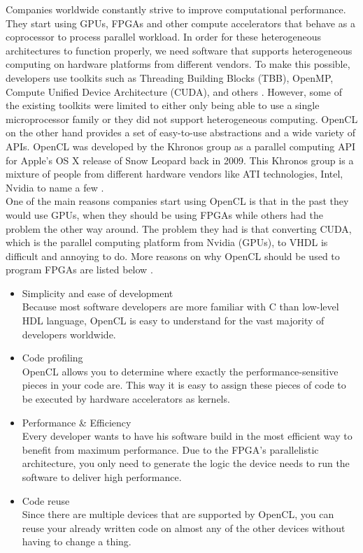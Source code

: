 \documentclass[a4paper, 11pt]{report}
\begin{document}
Companies worldwide constantly strive to improve computational performance. They start using GPUs, FPGAs and other compute accelerators that behave as a coprocessor to process parallel workload. In order for these heterogeneous architectures to function properly, we need software that supports heterogeneous computing on hardware platforms from different vendors. To make this possible, developers use toolkits such as Threading Building Blocks (TBB), OpenMP, Compute Unified Device Architecture (CUDA), and others \cite{stone2010opencl}. However, some of the existing toolkits were limited to either only being able to use a single microprocessor family or they did not support heterogeneous computing. OpenCL on the other hand provides a set of easy-to-use abstractions and a wide variety of APIs. OpenCL was developed by the Khronos group as a parallel computing API for Apple's OS X release of Snow Leopard back in 2009. This Khronos group is a mixture of people from different hardware vendors like ATI technologies, Intel, Nvidia to name a few \cite{KhronosMembers}.\\
One of the main reasons companies start using OpenCL is that in the past they would use GPUs, when they should be using FPGAs while others had the problem the other way around. The problem they had is that converting CUDA, which is the parallel computing platform from Nvidia (GPUs), to VHDL is difficult and annoying to do. More reasons on why OpenCL should be used to program FPGAs are listed below \cite{FPGAforDummies}.
\begin{itemize}
	\item {Simplicity and ease of development}\\
	Because most software developers are more familiar with C than low-level HDL language, OpenCL is easy to understand for the vast majority of developers worldwide.
	\item {Code profiling}\\
OpenCL allows you to determine where exactly the performance-sensitive pieces in your code are. This way it is easy to assign these pieces of code to be executed by hardware accelerators as kernels.
	\item {Performance \& Efficiency}\\
Every developer wants to have his software build in the most efficient way to benefit from maximum performance. Due to the FPGA's parallelistic architecture, you only need to generate the logic the device needs to run the software to deliver high performance.
	\item {Code reuse}\\
Since there are multiple devices that are supported by OpenCL, you can reuse your already written code on almost any of the other devices without having to change a thing.
\end{itemize}
\end{document}
